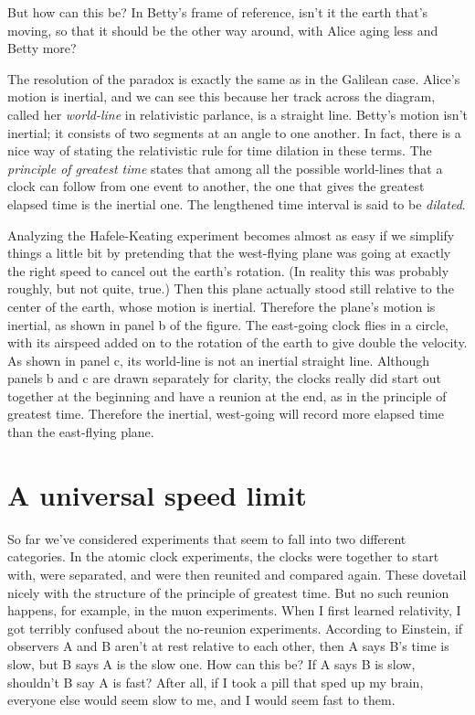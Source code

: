 But how can this be? In Betty's frame of reference, isn't it the earth that's moving, so that it should
be the other way around, with Alice aging less and Betty more?

The resolution of the paradox is exactly the same as
in the Galilean case. Alice's motion is inertial, and we can see this because her track across the diagram, called
her \emph{world-line} in relativistic parlance, is a straight line. Betty's motion isn't inertial; it consists of
two segments at an angle to one another. In fact, there is a nice way of stating the relativistic rule for time dilation
in these terms. The \emph{principle of greatest time} states that among all the possible world-lines that a clock
can follow from one event to another, the one that gives the greatest elapsed time is the inertial one.
The lengthened time interval is said to be \emph{dilated}.

Analyzing the Hafele-Keating experiment becomes almost as easy if we simplify things a little bit by pretending
that the west-flying plane was going at exactly the right speed to cancel out the earth's rotation. (In reality this
was probably roughly, but not quite, true.) Then this plane actually stood still relative to the center of the earth,
whose motion is inertial. Therefore the plane's motion is inertial, as shown in panel b of the figure. The east-going
clock flies in a circle, with its airspeed added on to the rotation of the earth to give double the velocity.
As shown in panel c, its world-line is not an inertial straight line. Although panels b and c are drawn separately
for clarity, the clocks really did start out together at the beginning and have a reunion at the end, as in
the principle of greatest time. Therefore the inertial, west-going will record more elapsed time
than the east-flying plane.


\section{A universal speed limit}

So far we've considered experiments that seem to fall into two different categories. In the 
atomic clock experiments,
the clocks were together to start with, were separated, and were then reunited and compared again. These
dovetail nicely with the structure of the principle of greatest time. But 
no such reunion happens, for example, in the muon experiments.
When I first learned relativity, I got terribly confused about the no-reunion experiments.
According to Einstein,
      if observers A and B aren't at rest relative to each other, then A says B's time
      is slow, but B says A is the slow one. How can this be? If A says B is slow, shouldn't
      B say A is fast? After all, if I took a pill that sped up my brain, everyone else would
      seem slow to me, and I would seem fast to them.

